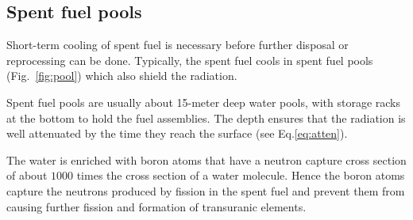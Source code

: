 \documentclass[nofootinbib,preprint,aps]{revtex4-1}
\begin{document}
    \subsection{Spent fuel pools}
    Short-term cooling of spent fuel is necessary before further disposal or reprocessing can be done.
    Typically, the spent fuel cools in spent fuel pools (Fig.~\ref{fig:pool}) which also shield the radiation.

    Spent fuel pools  are usually about 15-meter deep water pools,
    with storage racks at the bottom to hold the fuel assemblies. The depth ensures that the radiation
    is well attenuated by the time they reach the surface (see Eq.\ref{eq:atten}).

    The water is enriched with boron atoms that have a neutron capture cross section of about $1000$ times
    the cross section of a water molecule. Hence the boron atoms capture the neutrons produced by fission
    in the spent fuel
    and prevent them from causing further fission and formation of transuranic elements.
\end{document}
